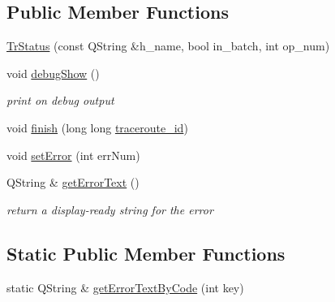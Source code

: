 \subsection*{Public Member Functions}
\begin{CompactItemize}
\item 
\hyperlink{classTrStatus_6679e8c913fe04b4ae96359235119b12}{TrStatus} (const QString \&h\_\-name, bool in\_\-batch, int op\_\-num)
\item 
\hypertarget{classTrStatus_a2adb1425bfe29e2303611d3c6687eb7}{
void \hyperlink{classTrStatus_a2adb1425bfe29e2303611d3c6687eb7}{debugShow} ()}
\label{classTrStatus_a2adb1425bfe29e2303611d3c6687eb7}

\begin{CompactList}\small\item\em print on debug output \item\end{CompactList}\item 
void \hyperlink{classTrStatus_cd81c57a0333bfd2733b48773174b890}{finish} (long long \hyperlink{classTrStatus_0a6327dd6f84425d2f90a0a3720d608a}{traceroute\_\-id})
\item 
void \hyperlink{classTrStatus_aafd283bd4ab3c0547fab9c3c82bab4f}{setError} (int errNum)
\item 
\hypertarget{classTrStatus_ed05db500144e2a57bf5569b5b23e4c0}{
QString \& \hyperlink{classTrStatus_ed05db500144e2a57bf5569b5b23e4c0}{getErrorText} ()}
\label{classTrStatus_ed05db500144e2a57bf5569b5b23e4c0}

\begin{CompactList}\small\item\em return a display-ready string for the error \item\end{CompactList}\end{CompactItemize}
\subsection*{Static Public Member Functions}
\begin{CompactItemize}
\item 
static QString \& \hyperlink{classTrStatus_c5de091ddb15e288c413b9e846658fd8}{getErrorTextByCode} (int key)
\end{CompactItemize}
